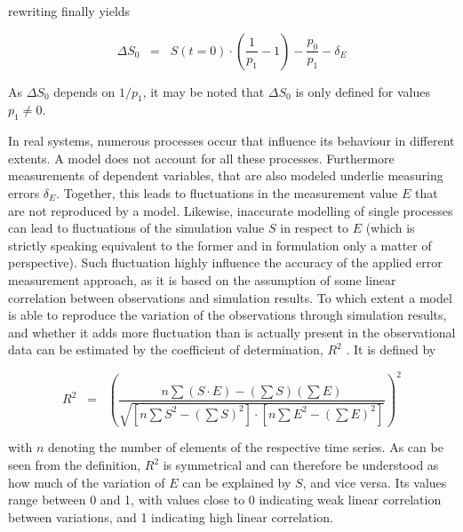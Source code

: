 \noindent rewriting finally yields

\begin{equation}
    \label{Eq-ErrMethDS0}
    \Delta S_0 \; \; = \; \; S(t\!=\!0) \cdot \left( \frac{1}{p_1} - 1 \right) - \frac{p_0}{p_1} - \delta_E
\end{equation}

As $\Delta S_0$ depends on $1/p_1$, it may be noted that $\Delta S_0$ is only defined for values $p_1 \neq 0$.

In real systems, numerous processes occur that influence its behaviour in different extents. 
A model does not account for all these processes. 
Furthermore measurements of dependent variables, that are also modeled underlie measuring errors $\delta_E$. 
Together, this leads to fluctuations in the measurement value $E$ that are not reproduced by a model. 
Likewise, inaccurate modelling of single processes can lead to fluctuations of the simulation value $S$ in respect to $E$ (which is strictly speaking equivalent to the former and in formulation only a matter of perspective). 
Such fluctuation highly influence the accuracy of the applied error measurement approach, as it is based on the assumption of some linear correlation between observations and simulation results. 
To which extent a model is able to reproduce the variation of the observations through simulation results, and whether it adds more fluctuation than is actually present in the observational data can be estimated by the coefficient of determination, $R^2$ \parencite{Mosteller.1977}. 
It is defined by

\begin{equation}
    \label{Eq-R2}
    R^2 \; \; = \; \; \left( \frac{ n \sum (S \cdot E) - (\sum S) (\sum E) }{ \sqrt{ [ n \sum S^2 - (\sum S)^2 ] \cdot [ n \sum E^2 - (\sum E)^2 ] } } \right)^2
\end{equation}

with $n$ denoting the number of elements of the respective time series. 
As can be seen from the definition, $R^2$ is symmetrical and can therefore be understood as how much of the variation of $E$ can be explained by $S$, and vice versa. 
Its values range between 0 and 1, with values close to 0 indicating weak linear correlation between variations, and 1 indicating high linear correlation.

